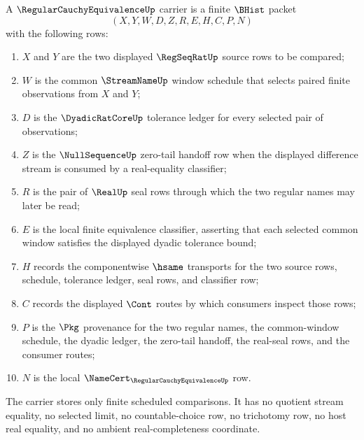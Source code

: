 \begin{definition}
\label{def:regular-cauchy-equivalence-carrier}
A $\RegularCauchyEquivalenceUp$ carrier is a finite $\BHist$ packet
$$
(X,Y,W,D,Z,R,E,H,C,P,N)
$$
with the following rows:
\begin{enumerate}
\item $X$ and $Y$ are the two displayed $\RegSeqRatUp$ source rows to be compared;
\item $W$ is the common $\StreamNameUp$ window schedule that selects paired finite observations from $X$ and $Y$;
\item $D$ is the $\DyadicRatCoreUp$ tolerance ledger for every selected pair of observations;
\item $Z$ is the $\NullSequenceUp$ zero-tail handoff row when the displayed difference stream is consumed by a real-equality classifier;
\item $R$ is the pair of $\RealUp$ seal rows through which the two regular names may later be read;
\item $E$ is the local finite equivalence classifier, asserting that each selected common window satisfies the displayed dyadic tolerance bound;
\item $H$ records the componentwise $\hsame$ transports for the two source rows, schedule, tolerance ledger, seal rows, and classifier row;
\item $C$ records the displayed $\Cont$ routes by which consumers inspect those rows;
\item $P$ is the $\Pkg$ provenance for the two regular names, the common-window schedule, the dyadic ledger, the zero-tail handoff, the real-seal rows, and the consumer routes;
\item $N$ is the local $\NameCert_{\RegularCauchyEquivalenceUp}$ row.
\end{enumerate}
The carrier stores only finite scheduled comparisons. It has no quotient stream equality, no selected limit, no countable-choice row, no trichotomy row, no host real equality, and no ambient real-completeness coordinate.
\end{definition}

